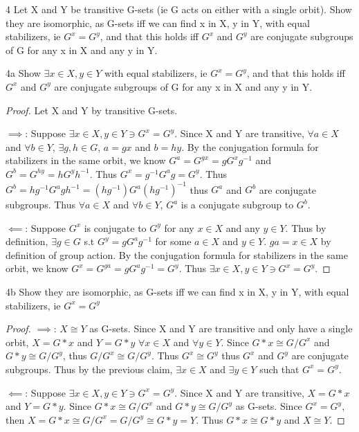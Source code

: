 \documentclass{article}
\begin{document}
\begin{PROB}{4}\label{Problem 4.}
    Let X and Y be transitive G-sets (ie G acts on either with a single orbit). Show they are isomorphic, as G-sets iff we can find x in X, y in Y, with equal stabilizers, ie $G^x = G^y$, and that this holds iff $G^x$ and $G^y$ are conjugate subgroups of G for any x in X and any y in Y.
\end{PROB}
\begin{claim}{4a}
    Show $\exists x \in X, y \in Y$ with equal stabilizers, ie $G^x = G^y$, and that this holds iff $G^x$ and $G^y$ are conjugate subgroups of G for any x in X and any y in Y.
\end{claim}
\begin{proof}
    Let X and Y by transitive G-sets. 

    $\implies$: Suppose $\exists x \in X, y \in Y \ni G^x = G^y$. Since X and Y are transitive, $\forall a \in X$ and $\forall b \in Y$, $\exists g, h \in G$, $a = gx$ and $b = hy$. By the conjugation formula for stabilizers in the same orbit, we know $G^a = G^{gx} = gG^xg^{-1}$ and $G^b = G^{hy} = hG^yh^{-1}$. Thus $G^x = g^{-1}G^ag = G^y$. Thus $G^b = hg^{-1}G^agh^{-1} = (hg^{-1})G^a(hg^{-1})^{-1}$ thus $G^a$ and $G^b$ are conjugate subgroups. Thus $\forall a \in X$ and $\forall b \in Y$, $G^a$ is a conjugate subgroup to $G^b$.
    
    $\impliedby$: Suppose $G^x$ is conjugate to $G^y$ for any $x \in X$ and any $y \in Y$. Thus by definition, $\exists g \in G$ s.t $G^y = gG^ag^{-1}$ for some $a \in X$ and $y \in Y$. $ga = x \in X$ by definition of group action. By the conjugation formula for stabilizers in the same orbit, we know $G^x = G^{ga} = gG^ag^{-1} = G^y$. Thus $\exists x \in X, y \in Y \ni G^x = G^y$.
\end{proof}
\begin{claim}{4b}
    Show they are isomorphic, as G-sets iff we can find x in X, y in Y, with equal stabilizers, ie $G^x = G^y$
\end{claim}
\begin{proof}
    $\implies$: $X \cong Y$ as G-sets. Since X and Y are transitive and only have a single orbit, $X = G \ast x$ and $Y = G \ast y$ $\forall x \in X$ and $\forall y \in Y$. Since $G \ast x \cong G/G^x$ and $G \ast y \cong G/G^y$, thus $G/G^x \cong G/G^y$. Thus $G^x \cong G^y$ thus $G^x$ and $G^y$ are conjugate subgroups. Thus by the previous claim, $\exists x \in X$ and $\exists y \in Y$ such that $G^x = G^y$.

    $\impliedby$: Suppose $\exists x \in X, y \in Y \ni G^x = G^y$. Since X and Y are transitive, $X = G \ast x$ and $Y = G \ast y$. Since $G \ast x \cong G/G^x$ and $G \ast y \cong G/G^y$ as G-sets. Since $G^x = G^y$, then $X = G \ast x \cong G/G^x = G/G^y \cong G \ast y = Y$. Thus $G \ast x \cong G \ast y$ and $X \cong Y$.
\end{proof}
\end{document}
